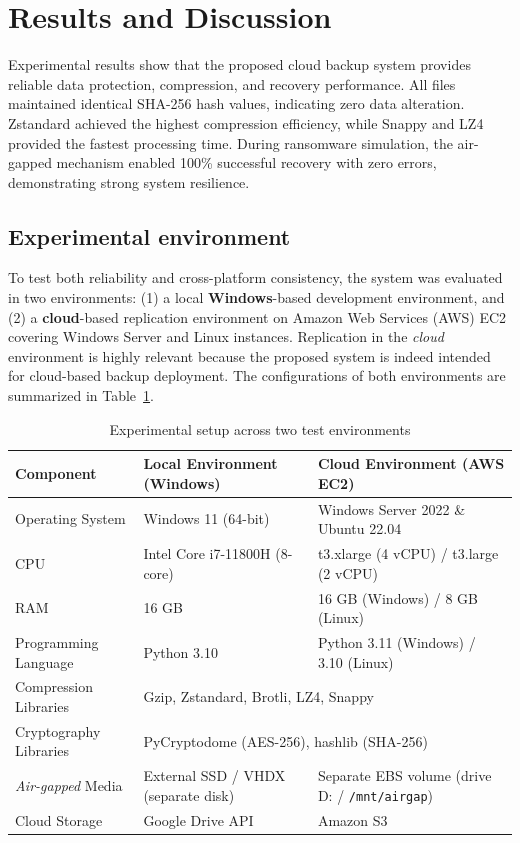 \documentclass{iaesarticle}
\begin{document}
\section{Results and Discussion}
\label{sec:results}
Experimental results show that the proposed cloud backup system provides reliable data protection, compression, and recovery performance. All files maintained identical SHA-256 hash values, indicating zero data alteration. Zstandard achieved the highest compression efficiency, while Snappy and LZ4 provided the fastest processing time. During ransomware simulation, the air-gapped mechanism enabled 100\% successful recovery with zero errors, demonstrating strong system resilience.

\subsection{Experimental environment}
To test both reliability and cross-platform consistency, the system was evaluated in two environments: (1) a local \textbf{Windows}-based development environment, and (2) a \textbf{cloud}-based replication environment on Amazon Web Services (AWS) EC2 covering Windows Server and Linux instances. Replication in the \textit{cloud} environment is highly relevant because the proposed system is indeed intended for cloud-based backup deployment. The configurations of both environments are summarized in Table~\ref{tab:experimental_setup}.

\begin{table}[H]
\centering
\fontsize{8pt}{10pt}\selectfont
\caption{Experimental setup across two test environments}
\label{tab:experimental_setup}
\begin{tabularx}{\textwidth}{@{}l X X@{}}
\hline
\textbf{Component} & \textbf{Local Environment (Windows)} & \textbf{Cloud Environment (AWS EC2)} \\
\hline
Operating System & Windows 11 (64-bit) & Windows Server 2022 \& Ubuntu 22.04 \\
CPU & Intel Core i7-11800H (8-core) & t3.xlarge (4 vCPU) / t3.large (2 vCPU) \\
RAM & 16 GB & 16 GB (Windows) / 8 GB (Linux) \\
Programming Language & Python 3.10 & Python 3.11 (Windows) / 3.10 (Linux) \\
Compression Libraries & \multicolumn{2}{l}{Gzip, Zstandard, Brotli, LZ4, Snappy} \\
Cryptography Libraries & \multicolumn{2}{l}{PyCryptodome (AES-256), hashlib (SHA-256)} \\
\textit{Air-gapped} Media & External SSD / VHDX (separate disk) & Separate EBS volume (drive D: / \texttt{/mnt/airgap}) \\
Cloud Storage & Google Drive API & Amazon S3 \\
\hline
\end{tabularx}
\end{table}
\end{document}
